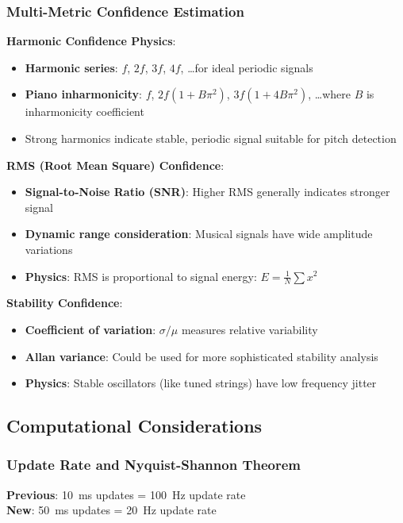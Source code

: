 \documentclass[11pt,a4paper]{article}
\begin{document}
\subsubsection{Multi-Metric Confidence Estimation}

\textbf{Harmonic Confidence Physics}:
\begin{itemize}
    \item \textbf{Harmonic series}: $f$, $2f$, $3f$, $4f$, \ldots for ideal periodic signals
    \item \textbf{Piano inharmonicity}: $f$, $2f(1+B\pi^2)$, $3f(1+4B\pi^2)$, \ldots where $B$ is inharmonicity coefficient
    \item Strong harmonics indicate stable, periodic signal suitable for pitch detection
\end{itemize}

\textbf{RMS (Root Mean Square) Confidence}:
\begin{itemize}
    \item \textbf{Signal-to-Noise Ratio (SNR)}: Higher RMS generally indicates stronger signal
    \item \textbf{Dynamic range consideration}: Musical signals have wide amplitude variations
    \item \textbf{Physics}: RMS is proportional to signal energy: $E = \frac{1}{N} \sum x^2$
\end{itemize}

\textbf{Stability Confidence}:
\begin{itemize}
    \item \textbf{Coefficient of variation}: $\sigma/\mu$ measures relative variability
    \item \textbf{Allan variance}: Could be used for more sophisticated stability analysis
    \item \textbf{Physics}: Stable oscillators (like tuned strings) have low frequency jitter
\end{itemize}

\subsection{Computational Considerations}

\subsubsection{Update Rate and Nyquist-Shannon Theorem}

\textbf{Previous}: \SI{10}{\milli\second} updates = \SI{100}{\hertz} update rate \\
\textbf{New}: \SI{50}{\milli\second} updates = \SI{20}{\hertz} update rate
\end{document}
